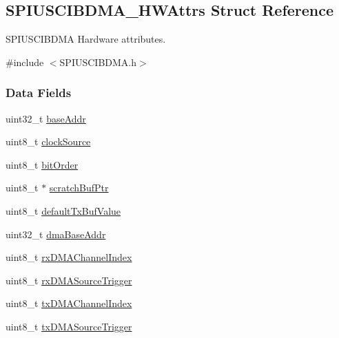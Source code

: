 \subsection{S\-P\-I\-U\-S\-C\-I\-B\-D\-M\-A\-\_\-\-H\-W\-Attrs Struct Reference}
\label{struct_s_p_i_u_s_c_i_b_d_m_a___h_w_attrs}


S\-P\-I\-U\-S\-C\-I\-B\-D\-M\-A Hardware attributes.  




{\ttfamily \#include $<$S\-P\-I\-U\-S\-C\-I\-B\-D\-M\-A.\-h$>$}

\subsubsection*{Data Fields}
\begin{DoxyCompactItemize}
\item 
uint32\-\_\-t \hyperlink{struct_s_p_i_u_s_c_i_b_d_m_a___h_w_attrs_aaae9facc7079e3bfd9b7a3b74d6f8652}{base\-Addr}
\item 
uint8\-\_\-t \hyperlink{struct_s_p_i_u_s_c_i_b_d_m_a___h_w_attrs_acb2a1355cc9a9d58aa4a5d8ce7dd3bdb}{clock\-Source}
\item 
uint8\-\_\-t \hyperlink{struct_s_p_i_u_s_c_i_b_d_m_a___h_w_attrs_a1f98aef8f8eb4880a35e395528a53f90}{bit\-Order}
\item 
uint8\-\_\-t $\ast$ \hyperlink{struct_s_p_i_u_s_c_i_b_d_m_a___h_w_attrs_a6d1e9c7223a23ecc26c3f4241c452be9}{scratch\-Buf\-Ptr}
\item 
uint8\-\_\-t \hyperlink{struct_s_p_i_u_s_c_i_b_d_m_a___h_w_attrs_a10bc4b0c5477703450364f93ddff1a94}{default\-Tx\-Buf\-Value}
\item 
uint32\-\_\-t \hyperlink{struct_s_p_i_u_s_c_i_b_d_m_a___h_w_attrs_ad75b8f15d31d6f08da669d43787c9844}{dma\-Base\-Addr}
\item 
uint8\-\_\-t \hyperlink{struct_s_p_i_u_s_c_i_b_d_m_a___h_w_attrs_ab92767e7ddea74ed100a42ebd5cdf9e7}{rx\-D\-M\-A\-Channel\-Index}
\item 
uint8\-\_\-t \hyperlink{struct_s_p_i_u_s_c_i_b_d_m_a___h_w_attrs_ae5dce176df8472f28ff3d2767646e550}{rx\-D\-M\-A\-Source\-Trigger}
\item 
uint8\-\_\-t \hyperlink{struct_s_p_i_u_s_c_i_b_d_m_a___h_w_attrs_a0825b66712b946981925d1032926dce5}{tx\-D\-M\-A\-Channel\-Index}
\item 
uint8\-\_\-t \hyperlink{struct_s_p_i_u_s_c_i_b_d_m_a___h_w_attrs_a8cf8e43314d66883d1d680bd2b1d2499}{tx\-D\-M\-A\-Source\-Trigger}
\end{DoxyCompactItemize}


